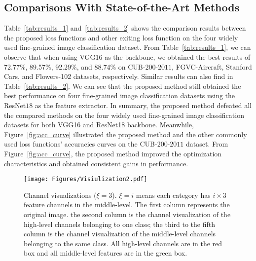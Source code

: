 \documentclass[journal]{IEEEtran}
\begin{document}
\subsection{Comparisons With State-of-the-Art Methods}\label{sec:Comparisons}
Table~\ref{tab:results_1} and~\ref{tab:results_2}  shows the comparison results between the proposed loss functions and other exiting loss function on the four widely used fine-grained image classification dataset.  From Table~\ref{tab:results_1}, we can observe that when using VGG16 as the backbone, we obtained the best results of 72.77\%, 89.57\%, 92.29\%, and 88.74\% on CUB-$200$-$2011$, FGVC-Aircraft, Stanford Cars, and Flowers-102 datasets, respectively.  Similar results can also find in Table~\ref{tab:results_2}. We can see that the proposed method still obtained the best performance on four fine-grained image classification datasets using the ResNet$18$ as the feature extractor. In summary, the proposed method defeated all the compared methods on the four widely used fine-grained image classification datasets for both VGG16 and ResNet18 backbone. Meanwhile, Figure~\ref{fig:acc_curve} illustrated the proposed method and the other commonly used loss functions' accuracies curves on the CUB-$200$-$2011$ dataset. From Figure~\ref{fig:acc_curve}, the proposed method improved the optimization characteristics and obtained consistent gains in performance.

\begin{figure*}[!t]
    \begin{center}
   \texttt{[image: Figures/Visiulization2.pdf]}

    \end{center}
    \caption{Channel visualizations ($\xi=3$). $\xi =i$ means each category has $i \times 3$ feature channels in the middle-level. The first column represents the original image. the second column is the channel visualization of the high-level channels belonging to one class; the third to the fifth column is the channel visualization of the middle-level channels belonging to the same class. All high-level channels are in the red box and all middle-level features are in the green box.}
    \label{fig:visualization_MC}
\end{figure*}
\end{document}
